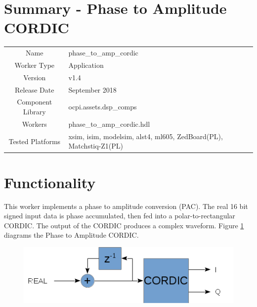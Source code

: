 \documentclass{article}
\author{} %
\date{Version \docVersion} %
\title{\docTitle}
\def\docVersion{1.4}
\def\comp{phase\_to\_amp\_cordic}
\def\Comp{Phase to Amplitude CORDIC}
\begin{document}
\section*{Summary - \Comp}
\begin{tabular}{|c|M{13.5cm}|}
	\hline
	                  &                                                    \\
	\hline
	Name              & \comp                                              \\
	\hline
	Worker Type       & Application                                        \\
	\hline
	Version           & v\docVersion \\
	\hline
	Release Date      & September 2018 \\
	\hline
	Component Library & ocpi.assets.dsp\_comps                              \\
	\hline
	Workers           & \comp.hdl                                          \\
	\hline
	Tested Platforms  & xsim, isim, modelsim, alst4, ml605, ZedBoard(PL), Matchstiq-Z1(PL) \\
	\hline
\end{tabular}

\section*{Functionality}
\begin{flushleft}
	This worker implements a phase to amplitude conversion (PAC). The real 16 bit signed input data is phase accumulated, then fed into a polar-to-rectangular CORDIC. The output of the CORDIC produces a complex waveform. Figure \ref{fig:phase_to_amp_cordic} diagrams the Phase to Amplitude CORDIC.

	\begin{figure}[h]
		\centering\captionsetup{type=figure}\includegraphics[scale=0.8]{phase_to_amp_cordic_block_diagram}
		\label{fig:phase_to_amp_cordic}
	\end{figure}
\end{flushleft}
\end{document}
